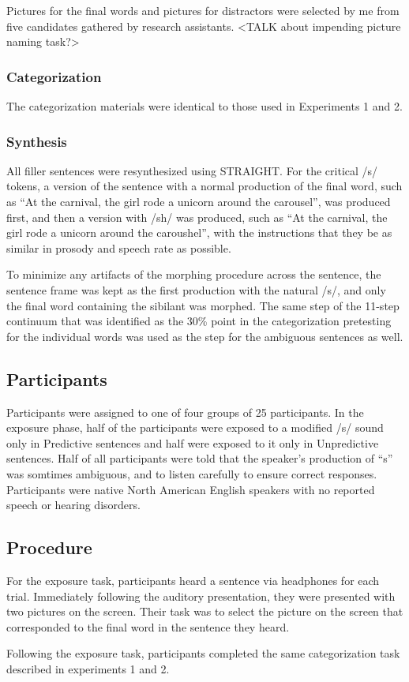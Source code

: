 Pictures for the final words and pictures for distractors were selected by me from five candidates gathered by research assistants.  <TALK about impending picture naming task?>


\subsubsection{Categorization}

The categorization materials were identical to those used in Experiments 1 and 2.
	

\subsubsection{Synthesis}

All filler sentences were resynthesized using STRAIGHT.  For the critical /s/ tokens, a version of the sentence with a normal production of the final word, such as ``At the carnival, the girl rode a unicorn around the carousel'', was produced first, and then a version with /sh/ was produced, such as ``At the carnival, the girl rode a unicorn around the caroushel'', with the instructions that they be as similar in prosody and speech rate as possible.

To minimize any artifacts of the morphing procedure across the sentence, the sentence frame was kept as the first production with the natural /s/, and only the final word containing the sibilant was morphed.  The same step of the 11-step continuum that was identified as the 30\% point in the categorization pretesting for the individual words was used as the step for the ambiguous sentences as well.

\subsection{Participants}

Participants were assigned to one of four groups of 25 participants.  In the exposure phase, half of the participants were exposed to a modified /s/ sound only in Predictive sentences and half were exposed to it only in Unpredictive sentences.  Half of all participants were told that the speaker's production of ``s'' was somtimes ambiguous, and to listen carefully to ensure correct responses.  Participants were native North American English speakers with no reported speech or hearing disorders.

\subsection{Procedure}

For the exposure task, participants heard a sentence via headphones for each trial.  Immediately following the auditory presentation, they were presented with two pictures on the screen.  Their task was to select the picture on the screen that corresponded to the final word in the sentence they heard.

Following the exposure task, participants completed the same categorization task described in experiments 1 and 2.

